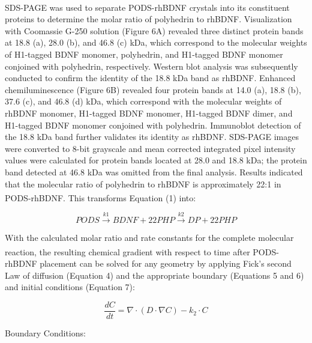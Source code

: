 \documentclass[review]{elsarticle}
\begin{document}
 
 SDS-PAGE was used to separate PODS\textsuperscript{\textregistered}-rhBDNF crystals into its constituent proteins to determine the molar ratio of polyhedrin to rhBDNF. Visualization with Coomassie G-250 solution (Figure 6A) revealed three distinct protein bands at 18.8 (a), 28.0 (b), and 46.8 (c) kDa, which correspond to the molecular weights of H1-tagged BDNF monomer, polyhedrin, and H1-tagged BDNF monomer conjoined with polyhedrin, respectively. Western blot analysis was subsequently conducted to confirm the identity of the 18.8 kDa band as rhBDNF. Enhanced chemiluminescence (Figure 6B) revealed four protein bands at 14.0 (a), 18.8 (b), 37.6 (c), and 46.8 (d) kDa, which correspond with the molecular weights of rhBDNF monomer, H1-tagged BDNF monomer, H1-tagged BDNF dimer, and H1-tagged BDNF monomer conjoined with polyhedrin. Immunoblot detection of the 18.8 kDa band further validates its identity as rhBDNF. SDS-PAGE images were converted to 8-bit grayscale and mean corrected integrated pixel intensity values were calculated for protein bands located at 28.0 and 18.8 kDa; the protein band detected at 46.8 kDa was omitted from the final analysis. Results indicated that the molecular ratio of polyhedrin to rhBDNF is approximately 22:1 in PODS\textsuperscript{\textregistered}-rhBDNF. This transforms Equation (1) into:
 
 
 
 \begin{equation}
 	PODS\overset{k1}{\longrightarrow}BDNF + 22PHP\overset{k2}{\longrightarrow}DP + 22PHP
 \end{equation}

 
 With the calculated molar ratio and rate constants for the complete molecular reaction, the resulting chemical gradient with respect to time after PODS\textsuperscript{\textregistered}-rhBDNF placement can be solved for any geometry by applying Fick’s second Law of diffusion (Equation 4) and the appropriate boundary (Equations 5 and 6) and initial conditions (Equation 7): 

\begin{equation}
\renewcommand{\vec}[1]{\boldsymbol{#1}}
\frac{dC}{dt}
= \nabla\cdot\left(D \cdot \nabla C\right)-k_{2}\cdot C
\end{equation}

Boundary Conditions:
\end{document}
